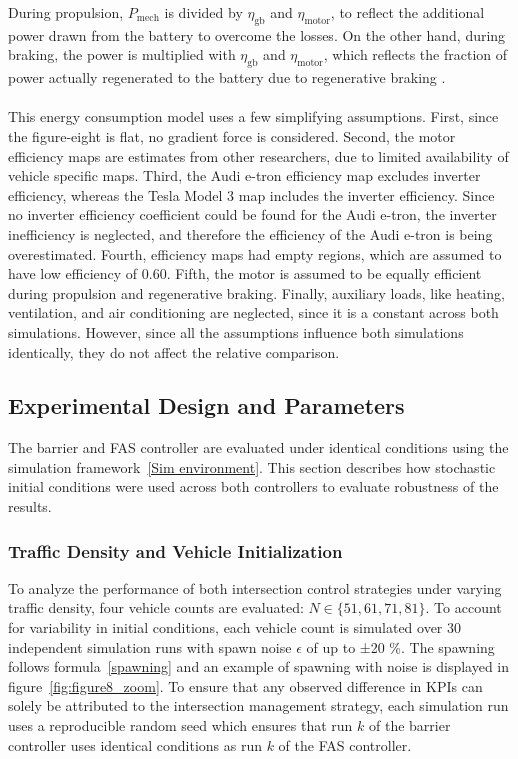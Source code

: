 During propulsion, \(P_\text{mech}\) is divided by \(\eta_\text{gb}\) and \(\eta_\text{motor}\), to reflect the additional power drawn from the battery to overcome the losses. On the other hand, during braking, the power is multiplied with \(\eta_\text{gb}\) and \(\eta_\text{motor}\), which reflects the fraction of power actually regenerated to the battery due to regenerative braking \parencite{luin2019microsimulation}.
\\\\
This energy consumption model uses a few simplifying assumptions. First, since the figure-eight is flat, no gradient force is considered. Second, the motor efficiency maps are estimates from other researchers, due to limited availability of vehicle specific maps. Third, the Audi e-tron efficiency map excludes inverter efficiency, whereas the Tesla Model 3 map includes the inverter efficiency. Since no inverter efficiency coefficient could be found for the Audi e-tron, the inverter inefficiency is neglected, and therefore the efficiency of the Audi e-tron is being overestimated. Fourth, efficiency maps had empty regions, which are assumed to have low efficiency of 0.60. Fifth, the motor is assumed to be equally efficient during propulsion and regenerative braking. Finally, auxiliary loads, like heating, ventilation, and air conditioning are neglected, since it is a constant across both simulations. However, since all the assumptions influence both simulations identically, they do not affect the relative comparison.

\subsection{Experimental Design and Parameters}
\label{Experimental Design}
The barrier and FAS controller  are evaluated under identical conditions using the simulation framework~\ref{Sim environment}. This section describes how stochastic initial conditions were used across both controllers to evaluate robustness of the results.
\subsubsection{Traffic Density and Vehicle Initialization}
\label{Experimental setup}
To analyze the performance of both intersection control strategies under varying traffic density, four vehicle counts are evaluated: \(N \in\{51,61, 71, 81\}.\) To account for variability in initial conditions, each vehicle count is simulated over 30 independent simulation runs with spawn noise \(\epsilon\) of up to ±20 \%. The spawning follows formula~\ref{spawning} and an example of spawning with noise is displayed in figure~\ref{fig:figure8_zoom}. To ensure that any observed difference in KPIs can solely be attributed to the intersection management strategy, each simulation run uses a reproducible random seed which ensures that run \(k\) of the barrier controller uses identical conditions as run \( k\) of the FAS controller. 
